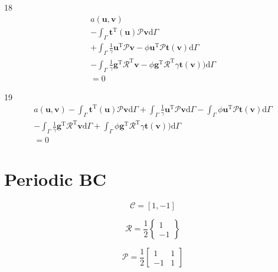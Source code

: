 \documentclass[a4paper,12pt]{article}
\begin{document}
18
\begin{equation}
\begin{split}
a(\mathbf{u},\mathbf{v})
\\-
\int_\Gamma
\mathbf{t}^\textrm{T}(\mathbf{u})\mathcal{P}\mathbf{v}
\textrm{d}\Gamma
\\+
\int_\Gamma
\frac{1}{\gamma}
\mathbf{u}^\textrm{T}\mathcal{P}\mathbf{v}
-
\phi\mathbf{u}^\textrm{T}\mathcal{P}\mathbf{t}(\mathbf{v})
\textrm{d}\Gamma
\\-
\int_\Gamma
\frac{1}{\gamma}
\mathbf{g}^\textrm{T}\mathcal{R}^\textrm{T}
\mathbf{v}
-
\phi\mathbf{g}^\textrm{T}\mathcal{R}^\textrm{T}\gamma\mathbf{t}(\mathbf{v}))
\textrm{d}\Gamma
\\=
0
\end{split}
\end{equation}

19
\begin{equation}
\begin{split}
a(\mathbf{u},\mathbf{v})
-
\int_\Gamma
\mathbf{t}^\textrm{T}(\mathbf{u})\mathcal{P}\mathbf{v}
\textrm{d}\Gamma
+
\int_\Gamma
\frac{1}{\gamma}
\mathbf{u}^\textrm{T}\mathcal{P}\mathbf{v}
\textrm{d}\Gamma
-
\int_\Gamma
\phi\mathbf{u}^\textrm{T}\mathcal{P}\mathbf{t}(\mathbf{v})
\textrm{d}\Gamma
\\-
\int_\Gamma
\frac{1}{\gamma}
\mathbf{g}^\textrm{T}\mathcal{R}^\textrm{T}
\mathbf{v}
\textrm{d}\Gamma
+
\int_\Gamma
\phi\mathbf{g}^\textrm{T}\mathcal{R}^\textrm{T}\gamma\mathbf{t}(\mathbf{v}))
\textrm{d}\Gamma
\\=
0
\end{split}
\end{equation}

\section{Periodic BC}

\begin{equation}
\mathcal{C} = [1,-1]
\end{equation}

\begin{equation}
\mathcal{R} = \frac{1}{2}
\left\{
\begin{array}{c}
1\\
-1
\end{array}
\right\}
\end{equation}

\begin{equation}
\mathcal{P} = \frac{1}{2}
\left[
\begin{array}{cc}
1 & 1\\
-1 & 1
\end{array}
\right]
\end{equation}
\end{document}
